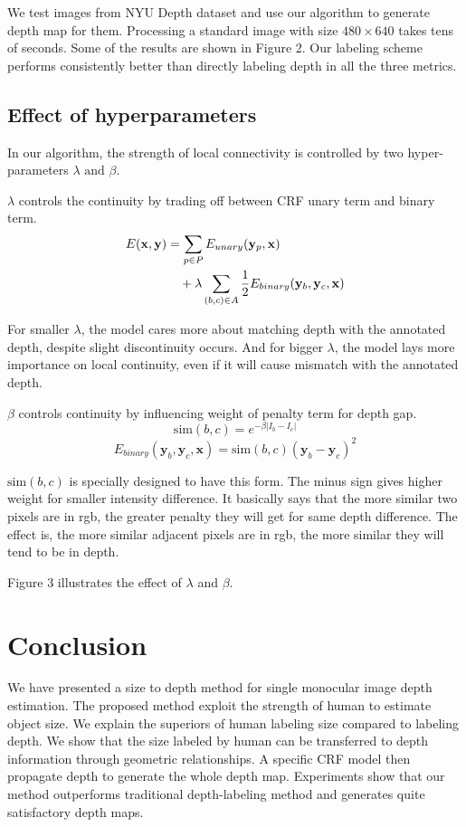 \documentclass[10pt,twocolumn,letterpaper]{article}
\begin{document}
We test images from NYU Depth dataset \cite{silberman11indoor, Silberman:ECCV12} and use our algorithm to generate depth map for them. Processing a standard image with size $480 \times 640$ takes tens of seconds. Some of the results are shown in Figure 2. Our labeling scheme performs consistently better than directly labeling depth in all the three metrics.
\subsection{Effect of hyperparameters}
In our algorithm, the strength of local connectivity is controlled by two hyper-parameters $\lambda \text{ and } \beta$.

$\lambda$ controls the continuity by trading off between CRF unary term and binary term.
\begin{align}
E(\mathbf{x}, \mathbf{y}) &= \sum_{p \in P}E_{unary}(\mathbf{y}_{p}, \mathbf{x}) \notag \\ &\quad + \lambda \sum_{(b, c) \in A} \frac{1}{2} E_{binary}(\mathbf{y}_b, \mathbf{y}_c, \mathbf{x})
\end{align} 

For smaller $\lambda$, the model cares more about matching depth with the annotated depth, despite slight discontinuity occurs. And for bigger $\lambda$, the model lays more importance on local continuity, even if it will cause mismatch with the annotated depth.

$\beta$ controls continuity by influencing weight of penalty term for depth gap.
\begin{equation}
\text{sim}(b, c) = e^{-\beta |I_b-I_c|}
\end{equation}
\begin{equation}
E_{binary}(\mathbf{y}_b, \mathbf{y}_c, \mathbf{x}) = \text{sim}(b, c) (\mathbf{y}_b-\mathbf{y}_c)^2
\end{equation}

$\text{sim}(b, c)$ is specially designed to have this form. The minus sign gives higher weight for smaller intensity difference. It basically says that the more similar two pixels are in rgb, the greater penalty they will get for same depth difference. The effect is, the more similar adjacent pixels are in rgb, the more similar they will tend to be in depth.

Figure 3 illustrates the effect of $\lambda$ and $\beta$.

\section{Conclusion}
We have presented a size to depth method for single monocular image depth estimation. The proposed method exploit the strength of human to estimate object size.  We explain the superiors of human labeling size compared to labeling depth. We show that the size labeled by human can be transferred to depth information through geometric relationships. A specific CRF model then propagate depth to generate the whole depth map. Experiments show that our method outperforms traditional depth-labeling method and generates quite satisfactory depth maps.
\end{document}
